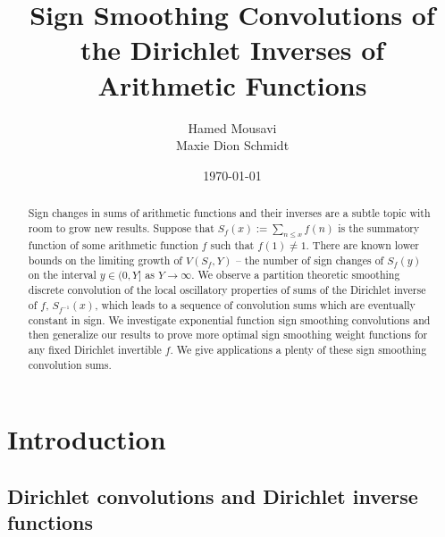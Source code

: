 \documentclass[11pt,reqno]{amsart}
\title[Sign Smoothing Convolutions]{
       Sign Smoothing Convolutions of the Dirichlet Inverses of Arithmetic Functions 
}
\author[H. Mousavi and M. D. Schmidt]{
         Hamed Mousavi \\ 
         Maxie Dion Schmidt 
}
\date{\today}
\numberwithin{figure}{section}
\numberwithin{table}{section}
\theoremstyle{plain}
\numberwithin{theorem}{section}
\theoremstyle{definition}
\begin{document}
 

\begin{abstract} 
Sign changes in sums of arithmetic functions and their inverses are a subtle topic 
with room to grow new results. Suppose that $S_f(x) := \sum_{n \leq x} f(n)$ is the 
summatory function of some arithmetic function $f$ such that $f(1) \neq 1$. There are known 
lower bounds on the limiting growth of $V(S_f, Y)$ -- the number of sign changes of $S_f(y)$ 
on the interval $y \in (0, Y]$ as $Y \rightarrow \infty$. We observe a partition theoretic 
smoothing discrete convolution of the local oscillatory properties of sums of the 
Dirichlet inverse of $f$, $S_{f^{-1}}(x)$, which leads to a sequence of convolution sums which 
are eventually constant in sign. We investigate exponential function sign smoothing convolutions 
and then generalize our results to prove more optimal sign smoothing weight functions for any 
fixed Dirichlet invertible $f$. We give applications a plenty of these sign smoothing convolution 
sums. 
\end{abstract}

\maketitle

\section{Introduction} 

\subsection{Dirichlet convolutions and Dirichlet inverse functions} 
\end{document}
